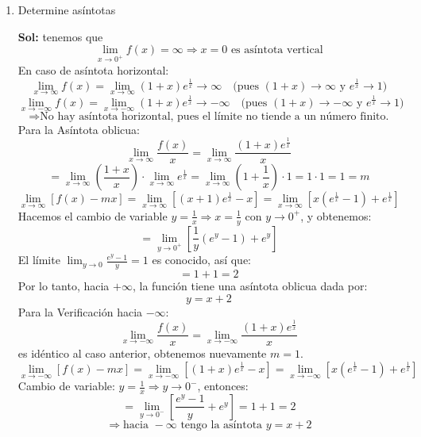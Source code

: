 \documentclass[letterpaper,12pt]{article}
\theoremstyle{plain}
\theoremstyle{definition}
\begin{document}
\begin{enumerate}
\begin{enumerate}
\color{blue}
\textbf{Sol:} Límite por la derecha:
        \[
        \lim_{x \to 0^+} (1 + x) e^{\frac{1}{x}} 
        = \lim_{y \to +\infty} \left(1 + \frac{1}{y}\right) e^y = \infty
        \]
         Límite por la izquierda:
        (haciendo el cambio de variable \( y = \frac{1}{x} \))
        \[
        \lim_{x \to 0^-} (1 + x) e^{\frac{1}{x}} 
        = \left( \lim_{x \to 0^-} (1 + x) \right) \cdot \left( \lim_{x \to 0^-} e^{\frac{1}{x}} \right) 
        = 1 \cdot 0 = 0
        \]
    como \( 0 \neq \infty \), la función \( f \) no se puede reparar la discontinuidad en \( x = 0 \).
\color{black}
    
        \item Determine asíntotas

\color{blue}
\textbf{Sol:} tenemos que
    \[
    \lim_{x \to 0^+} f(x) = \infty
    \Rightarrow x = 0 \text{ es asíntota vertical}
    \]
    En caso de asíntota horizontal: 
    \[
    \lim_{x \to \infty} f(x) = \lim_{x \to \infty} (1 + x) e^{\frac{1}{x}} \to \infty
    \quad \text{(pues } (1+x) \to \infty \text{ y } e^{\frac{1}{x}} \to 1)
    \]
    \[
    \lim_{x \to -\infty} f(x) = \lim_{x \to -\infty} (1 + x) e^{\frac{1}{x}} \to -\infty
    \quad \text{(pues } (1+x) \to -\infty \text{ y } e^{\frac{1}{x}} \to 1)
    \]
    \[
    \Rightarrow \text{No hay asíntota horizontal, pues el límite no tiende a un número finito.}
    \]
    Para la Asíntota oblicua:
    \[
    \lim_{x \to \infty} \frac{f(x)}{x} = \lim_{x \to \infty} \frac{(1 + x)e^{\frac{1}{x}}}{x}
    \]
    \[
    = \lim_{x \to \infty} \left( \frac{1 + x}{x} \right) \cdot \lim_{x \to \infty} e^{\frac{1}{x}} 
    = \lim_{x \to \infty} \left(1 + \frac{1}{x} \right) \cdot 1 = 1 \cdot 1 = 1 =m
    \]
    \[
\lim_{x \to \infty} \left[ f(x) - mx \right] = \lim_{x \to \infty} \left[ (x+1) e^{\frac{1}{x}} - x \right]
= \lim_{x \to \infty} \left[ x\left(e^{\frac{1}{x}} - 1 \right) + e^{\frac{1}{x}} \right]
\]
Hacemos el cambio de variable \( y = \frac{1}{x} \Rightarrow x = \frac{1}{y} \) con \( y \to 0^+ \), y obtenemos:
\[
= \lim_{y \to 0^+} \left[ \frac{1}{y} (e^y - 1) + e^y \right]
\]
El límite \(\displaystyle  \lim_{y \to 0} \frac{e^y - 1}{y} = 1 \) es conocido, así que:
\[
= 1 + 1 = 2
\]
Por lo tanto, hacia \( +\infty \), la función tiene una asíntota oblicua dada por:
\[
y = x + 2
\]
Para la Verificación hacia \( -\infty \):
\[
\lim_{x \to -\infty} \frac{f(x)}{x} = \lim_{x \to -\infty} \frac{(1 + x) e^{\frac{1}{x}}}{x}
\]
es idéntico al caso anterior, obtenemos nuevamente \( m = 1 \).
\[
\lim_{x \to -\infty} \left[ f(x) - mx \right] 
= \lim_{x \to -\infty} \left[ (1+x)e^{\frac{1}{x}} - x \right]
= \lim_{x \to -\infty} \left[ x(e^{\frac{1}{x}} - 1) + e^{\frac{1}{x}} \right]
\]
Cambio de variable: \( y = \frac{1}{x} \Rightarrow y \to 0^- \), entonces:
\[
= \lim_{y \to 0^-} \left[ \frac{e^y - 1}{y} + e^y \right] = 1 + 1 = 2
\]
\[
\Rightarrow \text{hacia } -\infty \text{ tengo la asíntota } y = x + 2
\]
\color{black}


\end{enumerate}
\end{enumerate}
\end{document}
